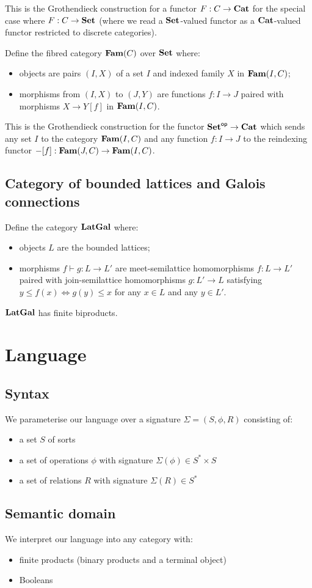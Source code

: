 \documentclass[acmsmall,nonacm]{acmart}
\begin{document}
\noindent This is the Grothendieck construction for a functor $F: C \to \mathbf{Cat}$ for the special case where $F: C
\to \mathbf{Set}$ (where we read a $\mathbf{Set}$-valued functor as a $\mathbf{Cat}$-valued functor restricted to discrete
categories).

Define the fibred category $\mathbf{Fam}(C)$ over $\mathbf{Set}$ where:
\begin{itemize}
\item objects are pairs $(I, X)$ of a set $I$ and indexed family $X$ in $\mathbf{Fam}(I,C)$;
\item morphisms from $(I, X)$ to $(J, Y)$ are functions $f: I \to J$ paired with morphisms $X \to Y[f]$ in
$\mathbf{Fam}(I,C)$.
\end{itemize}

\noindent This is the Grothendieck construction for the functor $\mathbf{Set}^{\mathsf{op}} \to \mathbf{Cat}$ which sends any set $I$
to the category $\mathbf{Fam}(I,C)$ and any function $f: I \to J$ to the reindexing functor $-[f]: \mathbf{Fam}(J,C) \to
\mathbf{Fam}(I,C)$.

\noindent {}

\subsection{Category of bounded lattices and Galois connections}

Define the category $\mathbf{LatGal}$ where:
\begin{itemize}
\item objects $L$ are the bounded lattices;
\item morphisms $f \vdash g: L \to L'$ are meet-semilattice homomorphisms $f: L \to L'$ paired with
join-semilattice homomorphisms $g: L' \to L$ satisfying $y \leq f(x) \iff g(y) \leq x$ for any $x \in L$ and any
$y \in L'$.
\end{itemize}

\noindent $\mathbf{LatGal}$ has finite biproducts. 

\section{Language}

\subsection{Syntax}

We parameterise our language over a signature $\Sigma = (S, \phi, R)$ consisting of:
\begin{itemize}
\item a set $S$ of sorts
\item a set of operations $\phi$ with signature $\Sigma(\phi) \in S^* \times S$
\item a set of relations $R$ with signature $\Sigma(R) \in S^*$
\end{itemize}

\subsection{Semantic domain}

We interpret our language into any category with:
\begin{itemize}
\item finite products (binary products and a terminal object)
\item Booleans
\end{itemize}
\end{document}
